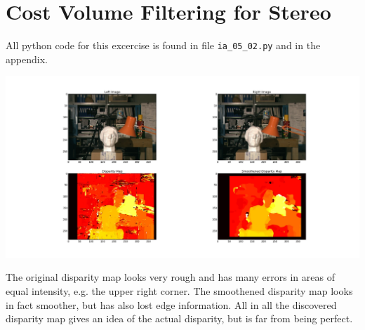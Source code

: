 \documentclass[11pt,a4paper]{scrartcl}
\begin{document}
\section{Cost Volume Filtering for Stereo}
All python code for this excercise is found in file \verb$ia_05_02.py$ and in the appendix. 

\includegraphics[width=.99\linewidth]{disparity_maps.jpg}

The original disparity map looks very rough and has many errors in areas of equal intensity, e.g. the upper right corner. The smoothened disparity map looks in fact smoother, but has also lost edge information. 
All in all the discovered disparity map gives an idea of the actual disparity, but is far from being perfect.

\newpage
\appendix

\newpage

\end{document}
